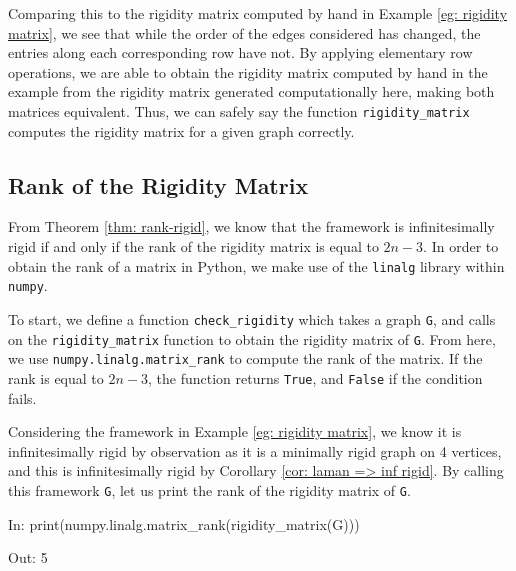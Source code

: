 \begin{flushleft}
Comparing this to the rigidity matrix computed by hand in Example \ref{eg: rigidity matrix}, we see that while the order of the edges considered has changed, the entries along each corresponding row have not. By applying elementary row operations, we are able to obtain the rigidity matrix computed by hand in the example from the rigidity matrix generated computationally here, making both matrices equivalent. Thus, we can safely say the function \texttt{rigidity\_matrix} computes the rigidity matrix for a given graph correctly.
\end{flushleft}

\subsection{Rank of the Rigidity Matrix}

\begin{flushleft}
From Theorem \ref{thm: rank-rigid}, we know that the framework is infinitesimally rigid if and only if the rank of the rigidity matrix is equal to $2n-3$. In order to obtain the rank of a matrix in Python, we make use of the \texttt{linalg} library within \texttt{numpy}. 
\end{flushleft}

\begin{flushleft}
To start, we define a function \texttt{check\_rigidity} which takes a graph \texttt{G}, and calls on the \texttt{rigidity\_matrix} function to obtain the rigidity matrix of \texttt{G}. From here, we use \texttt{numpy.linalg.matrix\_rank} to compute the rank of the matrix. If the rank is equal to $2n-3$, the function returns \texttt{True}, and \texttt{False} if the condition fails.
\end{flushleft}

\begin{flushleft}
Considering the framework in Example \ref{eg: rigidity matrix}, we know it is infinitesimally rigid by observation as it is a minimally rigid graph on 4 vertices, and this is infinitesimally rigid by Corollary \ref{cor: laman => inf rigid}. By calling this framework \texttt{G}, let us print the rank of the rigidity matrix of \texttt{G}.
\end{flushleft}

\begin{code}
    In: print(numpy.linalg.matrix_rank(rigidity_matrix(G)))

    Out: 5
\end{code}

